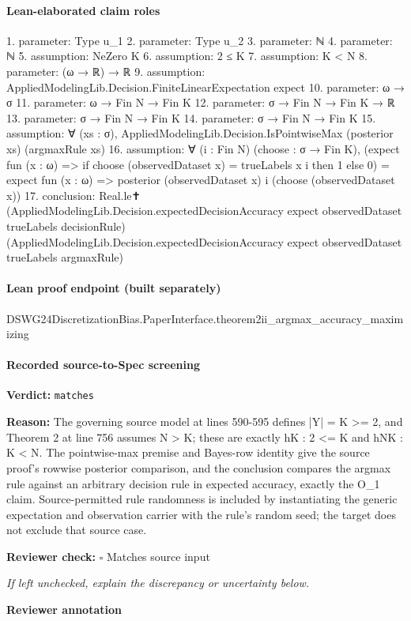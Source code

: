 \documentclass[10pt]{article}
\newcommand{\reviewerbox}{%
  \par\noindent\fbox{\parbox{0.96\linewidth}{\rule{0pt}{0.38in}}}\par
}
\newcommand{\reviewmatch}[1]{%
  \par\noindent\textbf{Reviewer check:} $\square$\; #1\par
  \noindent\emph{If left unchecked, explain the discrepancy or uncertainty below.}\par
}
\begin{document}
\paragraph{Lean-elaborated claim roles}\begin{ReviewVerbatim}
1. parameter: Type u_1
2. parameter: Type u_2
3. parameter: ℕ
4. parameter: ℕ
5. assumption: NeZero K
6. assumption: 2 ≤ K
7. assumption: K < N
8. parameter: (ω → ℝ) → ℝ
9. assumption: AppliedModelingLib.Decision.FiniteLinearExpectation expect
10. parameter: ω → σ
11. parameter: ω → Fin N → Fin K
12. parameter: σ → Fin N → Fin K → ℝ
13. parameter: σ → Fin N → Fin K
14. parameter: σ → Fin N → Fin K
15. assumption: ∀ (xs : σ), AppliedModelingLib.Decision.IsPointwiseMax (posterior xs) (argmaxRule xs)
16. assumption: ∀ (i : Fin N) (choose : σ → Fin K),
  (expect fun (x : ω) => if choose (observedDataset x) = trueLabels x i then 1 else 0) =
    expect fun (x : ω) => posterior (observedDataset x) i (choose (observedDataset x))
17. conclusion: Real.le✝ (AppliedModelingLib.Decision.expectedDecisionAccuracy expect observedDataset trueLabels decisionRule)
  (AppliedModelingLib.Decision.expectedDecisionAccuracy expect observedDataset trueLabels argmaxRule)
\end{ReviewVerbatim}

\paragraph{Lean proof endpoint (built separately)}\begin{ReviewVerbatim}
DSWG24DiscretizationBias.PaperInterface.theorem2ii_argmax_accuracy_maximizing
\end{ReviewVerbatim}

\paragraph{Recorded source-to-Spec screening}
\textbf{Verdict:} \texttt{matches}
\\
{\raggedright
\textbf{Reason:} The governing source model at lines 590-\allowbreak{}595 defines |Y| = K >= 2, and Theorem 2 at line 756 assumes N > K;\allowbreak{} these are exactly hK :\allowbreak{} 2 <= K and hNK :\allowbreak{} K < N.\allowbreak{} The pointwise-\allowbreak{}max premise and Bayes-\allowbreak{}row identity give the source proof's rowwise posterior comparison, and the conclusion compares the argmax rule against an arbitrary decision rule in expected accuracy, exactly the O\_\allowbreak{}1 claim.\allowbreak{} Source-\allowbreak{}permitted rule randomness is included by instantiating the generic expectation and observation carrier with the rule's random seed;\allowbreak{} the target does not exclude that source case.\allowbreak{}
\par}
\reviewmatch{Matches source input}
\noindent\textbf{Reviewer annotation}\par
\reviewerbox
\end{document}
